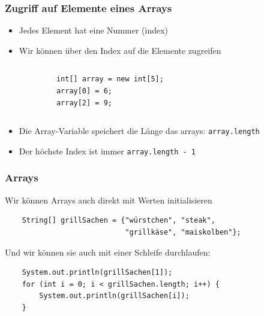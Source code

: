 \documentclass{../../presentation}
\begin{document}
\begin{frame}[fragile]
    \frametitle{Zugriff auf Elemente eines Arrays}
    \begin{itemize}
        \item Jedes Element hat eine Nummer (index)
        \item Wir können über den Index auf die Elemente zugreifen
    \end{itemize}
    \begin{columns}
        \begin{verbatim}
            int[] array = new int[5];
            array[0] = 6;
            array[2] = 9;
        \end{verbatim}

        \begin{center}
        \end{center}
    \end{columns}

    \vspace{0.5cm}

    \begin{itemize}
        \item Die Array-Variable speichert die Länge das arrays: \texttt{array.length}
        \item Der höchste Index ist immer \texttt{array.length - 1}
    \end{itemize}
\end{frame}

\begin{frame}[fragile]
    \frametitle{Arrays}
    Wir können Arrays auch direkt mit Werten initialisieren
    \begin{verbatim}
    String[] grillSachen = {"würstchen", "steak", 
                            "grillkäse", "maiskolben"};
    \end{verbatim}
    Und wir können sie auch mit einer Schleife durchlaufen:
    \begin{verbatim}
    System.out.println(grillSachen[1]);
    for (int i = 0; i < grillSachen.length; i++) {
        System.out.println(grillSachen[i]);
    }
    \end{verbatim}
\end{frame}
\end{document}

